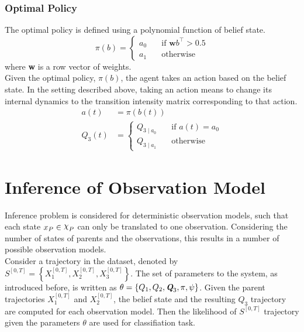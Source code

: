 \subsubsection{Optimal Policy}
The optimal policy is defined using a polynomial function of belief state.
\begin{equation}
\pi(b) = 
\begin{cases}
a_0 & \quad \text{if } \textbf{w}b^\intercal > 0.5 \\
a_1 & \quad \text{otherwise}
\end{cases}
\label{eq:policy}
\end{equation}
where \textbf{w} is a row vector of weights.\\
Given the optimal policy, $ \pi(b) $, the agent takes an action based on the belief state. In the setting described above, taking an action means to change its internal dynamics to the transition intensity matrix corresponding to that action.
\begin{align}
a(t) &= \pi(b(t))\\
Q_3(t) & = \begin{cases}
Q_{3\mid a_{0}} & \quad \text{if } a(t) = a_0 \\
Q_{3\mid a_{1}} & \quad \text{otherwise}
\end{cases}
\label{eq:Q_3_traj}
\end{align}

\section{Inference of Observation Model}
\label{sec:inf_setup}
Inference problem is considered for deterministic observation models, such that each state $ x_P \in \rchi_P $ can only be translated to one observation. Considering the number of states of parents and the observations, this results in a number of possible observation models. \\
Consider a trajectory in the dataset, denoted by $ S^{[0,T]} = \left\lbrace X_1^{[0,T]} , X_2^{[0,T]}, X_3^{[0,T]}\right\rbrace $. The set of parameters to the system, as introduced before, is written as $  \theta = \left\lbrace  Q_{1}, Q_{2}, \textit{\textbf{Q}}_3, \pi, \psi \right\rbrace $. Given the parent trajectories $ X_1^{[0,T]} $ and $ X_2^{[0,T]} $, the belief state and the resulting $ Q_3 $ trajectory are computed for each observation model. Then the likelihood of $ S^{[0,T]} $ trajectory given the parameters $ \theta $ are used for classifiation task.

